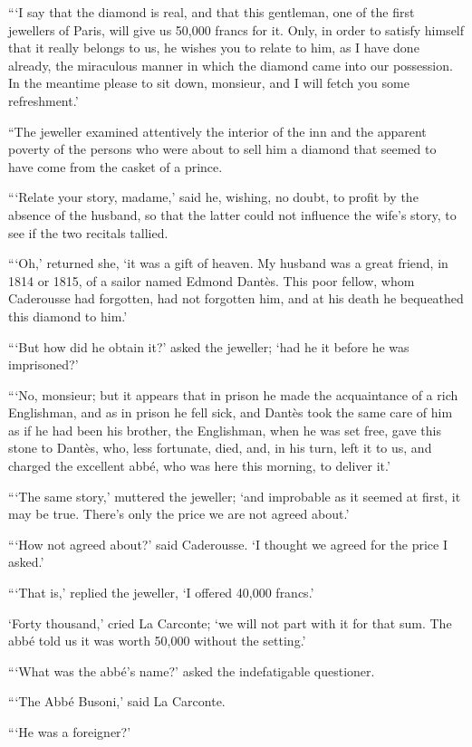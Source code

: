 “‘I say that the diamond is real, and that this gentleman, one of the
first jewellers of Paris, will give us 50,000 francs for it. Only, in
order to satisfy himself that it really belongs to us, he wishes you to
relate to him, as I have done already, the miraculous manner in which
the diamond came into our possession. In the meantime please to sit
down, monsieur, and I will fetch you some refreshment.’

“The jeweller examined attentively the interior of the inn and the
apparent poverty of the persons who were about to sell him a diamond
that seemed to have come from the casket of a prince.

“‘Relate your story, madame,’ said he, wishing, no doubt, to profit by
the absence of the husband, so that the latter could not influence the
wife’s story, to see if the two recitals tallied.

“‘Oh,’ returned she, ‘it was a gift of heaven. My husband was a great
friend, in 1814 or 1815, of a sailor named Edmond Dantès. This poor
fellow, whom Caderousse had forgotten, had not forgotten him, and at
his death he bequeathed this diamond to him.’

“‘But how did he obtain it?’ asked the jeweller; ‘had he it before he
was imprisoned?’

“‘No, monsieur; but it appears that in prison he made the acquaintance
of a rich Englishman, and as in prison he fell sick, and Dantès took
the same care of him as if he had been his brother, the Englishman,
when he was set free, gave this stone to Dantès, who, less fortunate,
died, and, in his turn, left it to us, and charged the excellent abbé,
who was here this morning, to deliver it.’

“‘The same story,’ muttered the jeweller; ‘and improbable as it seemed
at first, it may be true. There’s only the price we are not agreed
about.’

“‘How not agreed about?’ said Caderousse. ‘I thought we agreed for the
price I asked.’

“‘That is,’ replied the jeweller, ‘I offered 40,000 francs.’

‘Forty thousand,’ cried La Carconte; ‘we will not part with it for that
sum. The abbé told us it was worth 50,000 without the setting.’

“‘What was the abbé’s name?’ asked the indefatigable questioner.

“‘The Abbé Busoni,’ said La Carconte.

“‘He was a foreigner?’


